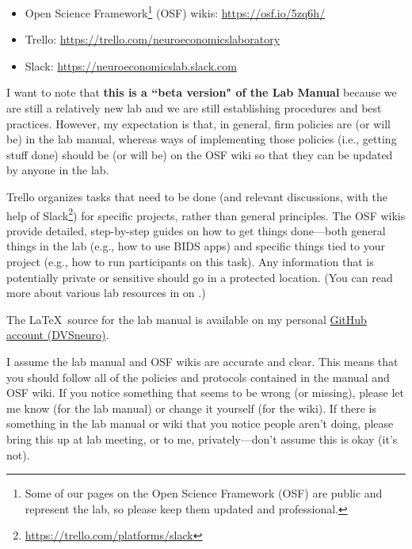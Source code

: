 \documentclass[letterpaper,12pt,oneside]{memoir}
\begin{document}
\begin{itemize}
\item Open Science Framework\footnote{Some of our pages on the Open Science Framework (OSF) are public and represent the lab, so please keep them updated and professional.} (OSF) wikis: \url{https://osf.io/5zq6h/}
\item Trello: \url{https://trello.com/neuroeconomicslaboratory}
\item Slack: \url{https://neuroeconomicslab.slack.com}
\end{itemize}

I want to note that \textbf{this is a ``beta version" of the Lab Manual} because we are still a relatively new lab and we are still establishing procedures and best practices. However, my expectation is that, in general, firm policies are (or will be) in the lab manual, whereas ways of implementing those policies (i.e., getting stuff done) should be (or will be) on the OSF wiki so that they can be updated by anyone in the lab. 

\pagebreak

Trello organizes tasks that need to be done (and relevant discussions, with the help of Slack\footnote{\url{https://trello.com/platforms/slack}}) for specific projects, rather than general principles. The OSF wikis provide detailed, step-by-step guides on how to get things done---both general things in the lab (e.g., how to use BIDS apps) and specific things tied to your project (e.g., how to run participants on this task). Any information that is potentially private or sensitive should go in a protected location. (You can read more about various lab resources in  on .)

The \LaTeX\ source for the lab manual is available on my personal \href{https://github.com/dvsneuro/smithlab_manual}{GitHub account (DVSneuro)}.

\begin{shaded}
\noindent I assume the lab manual and OSF wikis are accurate and clear. This means that you should follow all of the policies and protocols contained in the manual and OSF wiki. If you notice something that seems to be wrong (or missing), please let me know (for the lab manual) or change it yourself (for the wiki). If there is something in the lab manual or wiki that you notice people aren't doing, please bring this up at lab meeting, or to me, privately---don't assume this is okay (it's not).
\end{shaded}
\end{document}

